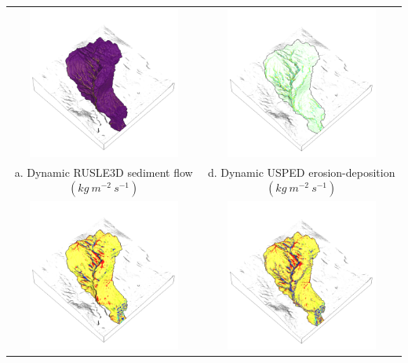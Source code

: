 \documentclass{standalone}
\begin{document}
\scriptsize
\centering 

\begin{tabular}{m{} m{}}
%
\multicolumn{1}{c}{\includegraphics[height=50mm]{../../images/rusle_3d/flux.png}} &
\multicolumn{1}{c}{\includegraphics[height=50mm]{../../images/usped_3d/erosion_deposition.png}}\\
\multicolumn{1}{c}{a. Dynamic RUSLE3D sediment flow $(kg ~ m^{-2} ~ s^{-1})$} &
\multicolumn{1}{c}{d. Dynamic USPED erosion-deposition $(kg ~ m^{-2} ~ s^{-1})$}\\
%
\multicolumn{1}{c}{\includegraphics[height=50mm]{../../images/rusle_3d/landforms.png}} &
\multicolumn{1}{c}{\includegraphics[height=50mm]{../../images/usped_3d/landforms.png}}\\

\end{tabular}
\end{document}
